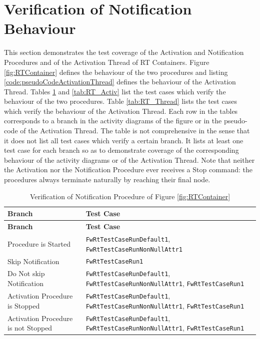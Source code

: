 \documentclass[requirements]{../fwprofile}
\begin{document}
\section{Verification of Notification Behaviour}\label{Appendix_E_RT_Notif}
This section demonstrates the test coverage of the Activation and Notification Procedures and of the Activation Thread of RT Containers. Figure \ref{fig:RTContainer} defines the behaviour of the two procedures and listing \ref{code:pseudoCodeActivationThread} defines the behaviour of the Activation Thread.
Tables \ref{tab:RT_Notif} and \ref{tab:RT_Activ} list the test cases which verify the behaviour of the two procedures. Table \ref{tab:RT_Thread} lists the test cases which verify the behaviour of the Activation Thread. Each row in the tables corresponds to a branch in the activity diagrams of the figure or in the pseudo-code of the Activation Thread. The table is not comprehensive in the sense that it does not list all test cases which verify a certain branch. It lists at least one test case for each branch so as to demonstrate coverage of the corresponding behaviour of the activity diagrams or of the Activation Thread. Note that neither the Activation nor the Notification Procedure ever receives a Stop command: the procedures always terminate naturally by reaching their final node.


\begin{longtable}{|p{5.7cm}|p{5.5cm}|}
\caption{Verification of Notification Procedure of Figure \ref{fig:RTContainer}}
\label{tab:RT_Notif} \\
\hline
\rowcolor{gray}
\textbf{Branch} & \textbf{Test Case} \\
\hline
\endfirsthead
\rowcolor{gray}
\textbf{Branch} & \textbf{Test Case} \\
\hline
\endhead
Procedure is Started & \texttt{FwRtTestCaseRunDefault1}, \texttt{FwRtTestCaseRunNonNullAttr1} \\
\hline
Skip Notification & \texttt{FwRtTestCaseRun1} \\
\hline
Do Not skip Notification & \texttt{FwRtTestCaseRunDefault1}, \texttt{FwRtTestCaseRunNonNullAttr1}, \texttt{FwRtTestCaseRun1} \\
\hline
Activation Procedure is Stopped & \texttt{FwRtTestCaseRunDefault1}, \texttt{FwRtTestCaseRunNonNullAttr1}, \texttt{FwRtTestCaseRun1}\\
\hline
Activation Procedure is not Stopped & \texttt{FwRtTestCaseRunDefault1}, \texttt{FwRtTestCaseRunNonNullAttr1}, \texttt{FwRtTestCaseRun1}\\
\hline
\end{longtable}
\end{document}
